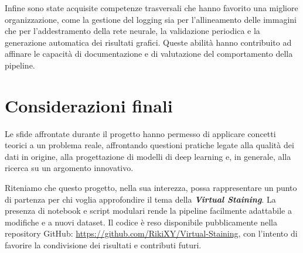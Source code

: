 \documentclass[a4paper,10pt]{article}
\begin{document}
Infine sono state acquisite competenze trasversali che hanno favorito una migliore organizzazione, come la gestione del logging sia per l'allineamento delle immagini che per l'addestramento della rete neurale, la validazione periodica e la generazione automatica dei risultati grafici. Queste abilità hanno contribuito ad affinare le capacità di documentazione e di valutazione del comportamento della pipeline.

\section{Considerazioni finali}
Le sfide affrontate durante il progetto hanno permesso di applicare concetti teorici a un problema reale, affrontando questioni pratiche legate alla qualità dei dati in origine, alla progettazione di modelli di deep learning e, in generale, alla ricerca su un argomento innovativo.

Riteniamo che questo progetto, nella sua interezza, possa rappresentare un punto di partenza per chi voglia approfondire il tema della \textbf{\textit{Virtual Staining}}. La presenza di notebook e script modulari rende la pipeline facilmente adattabile a modifiche e a nuovi dataset. Il codice è reso disponibile pubblicamente nella repository GitHub: \url{https://github.com/RikiXY/Virtual-Staining}, con l'intento di favorire la condivisione dei risultati e contributi futuri.
\end{document}
